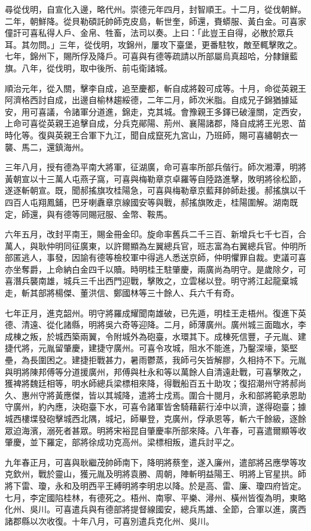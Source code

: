 \begin{pinyinscope}
尋從伐明，自宣化入邊，略代州。崇德元年四月，封智順王。十二月，從伐朝鮮。二年，朝鮮降。從貝勒碩託帥師克皮島，斬世奎，師還，賚蟒服、黃白金。可喜家僮訐可喜私得人戶、金帛、牲畜，法司以奏。上曰：「此豈王自得，必散於眾兵耳。其勿問。」三年，從伐明，攻錦州，屢攻下臺堡，更番駐牧，敵至輒擊敗之。七年，錦州下，賜所俘及降戶。可喜與有德等疏請以所部屬烏真超哈，分隸鑲藍旗。八年，從伐明，取中後所、前屯衛諸城。

順治元年，從入關，擊李自成，追至慶都，斬自成將穀可成等。十月，命從英親王阿濟格西討自成，出邊自榆林趨綏德，二年二月，師次米脂。自成兄子錦猶據延安，用可喜議，令諸軍分道進，錦走，克其城。會豫親王多鐸已破潼關，定西安，上命可喜從英親王追擊自成，分兵克鄖陽、荊州、襄陽諸郡，降自成將王光恩、苗時化等。復與英親王合軍下九江，聞自成竄死九宮山，乃班師，賜可喜繡朝衣一襲、馬二，還鎮海州。

三年八月，授有德為平南大將軍，征湖廣，命可喜率所部兵偕行。師次湘潭，明將黃朝宣以十三萬人屯燕子窩，可喜與梅勒章京卓羅等自陸路進擊，敗明將徐松節，遂逐斬朝宣。既，聞郝搖旗攻桂陽急，可喜與梅勒章京藍拜帥師赴援。郝搖旗以千四百人屯翔鳳鋪，巴牙喇纛章京線國安等與戰，郝搖旗敗走，桂陽圍解。湖南既定，師還，與有德等同賜冠服、金幣、鞍馬。

六年五月，改封平南王，賜金冊金印。旋命率舊兵二千三百、新增兵七千七百，合萬人，與耿仲明同征廣東，以許爾顯為左翼總兵官，班志富為右翼總兵官。仲明所部匿逃人，事發，因諭有德等檢校軍中得逃人悉送京師，仲明懼罪自裁。吏議可喜亦坐奪爵，上命納白金四千以贖。時明桂王駐肇慶，兩廣尚為明守。是歲除夕，可喜潛兵襲南雄，城兵三千出西門迎戰，擊敗之，立雲梯以登。明守將江起龍棄城走，斬其部將楊傑、董洪信、鄭國林等三十餘人、兵六千有奇。

七年正月，進克韶州。明守將羅成耀聞南雄破，已先遁，明桂王走梧州。復進下英德、清遠、從化諸縣，明將吳六奇等迎降。二月，師薄廣州。廣州城三面臨水，李成棟之叛，於城西築兩翼，令附城外為砲臺，水環其下。成棟死信豐，子元胤、建捷代將，元胤留肇慶，建捷守廣州。可喜令攻城，阻水不能進，乃鑿深壕，築堅壘，為長圍困之。建捷拒戰甚力，暑雨鬱蒸，我師弓矢皆解膠，久相持不下。元胤與明將陳邦傅等分道援廣州，邦傅與杜永和等以萬餘人自清遠赴戰，可喜擊敗之，獲裨將魏廷相等，明水師總兵梁標相來降，得戰船百五十助攻；復招潮州守將郝尚久、惠州守將黃應傑，皆以其城降，遣將士戍焉。圍合十閱月，永和部將範承恩助守廣州，約內應，決砲臺下水，可喜令諸軍皆舍騎藉薪行淖中以濟，遂得砲臺；據城西樓堞發砲擊城西北隅，城圮，師畢登，克廣州，俘承恩等，斬六千餘級，逐餘眾迫海濱，溺死者甚眾。明將宋裕昆自肇慶率所部來降。八年春，可喜遣爾顯等收肇慶，並下羅定，部將徐成功克高州。梁標相叛，遣兵討平之。

九年春正月，可喜與耿繼茂帥師南下，降明將蔡奎，遂入廉州，遣部將呂應學等攻克欽州，戰於靈山，獲元胤及明將袁勝、周朝，陣斬明益陽王、明將上官星拱。師將下雷、瓊，永和及明西平王縛明將李明忠以降。於是高、雷、廉、瓊四府皆定。七月，李定國陷桂林，有德死之。梧州、南寧、平樂、潯州、橫州皆復為明，東略化州、吳川。可喜遣兵與有德部將提督線國安，總兵馬雄、全節，合軍以進，廣西諸郡縣以次收復。十年八月，可喜別遣兵克化州、吳川。


\end{pinyinscope}
